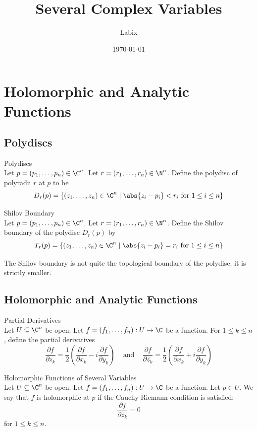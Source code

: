 \documentclass[a4paper]{article}
\title{Several Complex Variables}
\author{Labix}
\date{\today}
\begin{document}
\maketitle
\pagebreak
\tableofcontents
\pagebreak

\section{Holomorphic and Analytic Functions}
\subsection{Polydiscs}
\begin{defn}{Polydiscs}{}\\
Let $p=(p_1,\dots,p_n)\in\C^n$. Let $r=(r_1,\dots,r_n)\in\N^n$. Define the polydisc of polyradii $r$ at $p$ to be $$D_r(p)=\{(z_1,\dots,z_n)\in\C^n\;|\;\abs{z_i-p_i}<r_i\text{ for }1\leq i\leq n\}$$
\end{defn}

\begin{defn}{Shilov Boundary}{}\\
Let $p=(p_1,\dots,p_n)\in\C^n$. Let $r=(r_1,\dots,r_n)\in\N^n$. Define the Shilov boundary of the polydisc $D_r(p)$ by $$T_r(p)=\{(z_1,\dots,z_n)\in\C^n\;|\;\abs{z_i-p_i}=r_i\text{ for }1\leq i\leq n\}$$
\end{defn}

The Shilov boundary is not quite the topological boundary of the polydisc: it is strictly smaller. 

\subsection{Holomorphic and Analytic Functions}
\begin{defn}{Partial Derivatives}{}\\
Let $U\subseteq\C^n$ be open. Let $f=(f_1,\dots,f_n):U\to\C$ be a function. For $1\leq k\leq n$, define the partial derivatives $$\frac{\partial f}{\partial z_k}=\frac{1}{2}\left(\frac{\partial f}{\partial x_k}-i\frac{\partial f}{\partial y_k}\right)\;\;\;\text{ and }\;\;\;\frac{\partial f}{\partial\overline{z_k}}=\frac{1}{2}\left(\frac{\partial f}{\partial x_k}+i\frac{\partial f}{\partial y_k}\right)$$
\end{defn}

\begin{defn}{Holomorphic Functions of Several Variables}{}\\
Let $U\subseteq\C^n$ be open. Let $f=(f_1,\dots,f_n):U\to\C$ be a function. Let $p\in U$. We say that $f$ is holomorphic at $p$ if the Cauchy-Riemann condition is satisfied: $$\frac{\partial f}{\partial\overline{z}_k}=0$$ for $1\leq k\leq n$. 
\end{defn}
\end{document}
